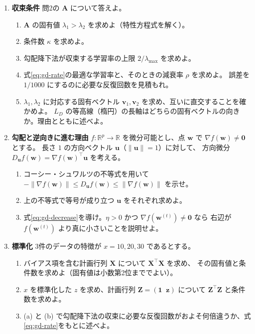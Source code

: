 \begin{enumerate}
  \item \textbf{収束条件}\quad
    問2の $\bm{A}$ について答えよ。
    \begin{enumerate}
      \item $\bm{A}$ の固有値 $\lambda_1 > \lambda_2$ を求めよ（特性方程式を解く）。
      \item 条件数 $\kappa$ を求めよ。
      \item 勾配降下法が収束する学習率の上限 $2/\lambda_{\max}$ を求めよ。
      \item 式\eqref{eq:gd-rate}の最適な学習率と、そのときの減衰率 $\rho$ を求めよ。
        誤差を $1/1000$ にするのに必要な反復回数を見積もれ。
      \item $\lambda_1, \lambda_2$ に対応する固有ベクトル $\bm{v}_1, \bm{v}_2$ を求め、互いに直交することを確かめよ。
        $L_D$ の等高線（楕円）の長軸はどちらの固有ベクトルの向きか。理由とともに述べよ。
    \end{enumerate}

  \item \textbf{勾配と逆向きに進む理由}\quad
    $f : \mathbb{R}^p \to \mathbb{R}$ を微分可能とし、点 $\bm{w}$ で $\nabla f(\bm{w}) \neq \bm{0}$ とする。
    長さ $1$ の方向ベクトル $\bm{u}$（$\|\bm{u}\| = 1$）に対して、
    方向微分 $D_{\bm{u}} f(\bm{w}) = \nabla f(\bm{w})^\top \bm{u}$ を考える。
    \begin{enumerate}
      \item コーシー・シュワルツの不等式を用いて $-\|\nabla f(\bm{w})\| \leq D_{\bm{u}} f(\bm{w}) \leq \|\nabla f(\bm{w})\|$ を示せ。
      \item 上の不等式で等号が成り立つ $\bm{u}$ をそれぞれ求めよ。
      \item 式\eqref{eq:gd-decrease}を導け。$\eta > 0$ かつ $\nabla f(\bm{w}^{(t)}) \neq \bm{0}$ なら
        右辺が $f(\bm{w}^{(t)})$ より真に小さいことを説明せよ。
    \end{enumerate}

  \item \textbf{標準化}\quad
    3件のデータの特徴が $x = 10, 20, 30$ であるとする。
    \begin{enumerate}
      \item バイアス項を含む計画行列 $\bm{X}$ について $\bm{X}^\top\bm{X}$ を求め、
        その固有値と条件数を求めよ（固有値は小数第2位まででよい）。
      \item $x$ を標準化した $z$ を求め、計画行列 $\bm{Z} = (\bm{1}\;\; \bm{z})$ について $\bm{Z}^\top\bm{Z}$ と条件数を求めよ。
      \item (a) と (b) で勾配降下法の収束に必要な反復回数がおよそ何倍違うか、式\eqref{eq:gd-rate}をもとに述べよ。
    \end{enumerate}


\end{enumerate}
